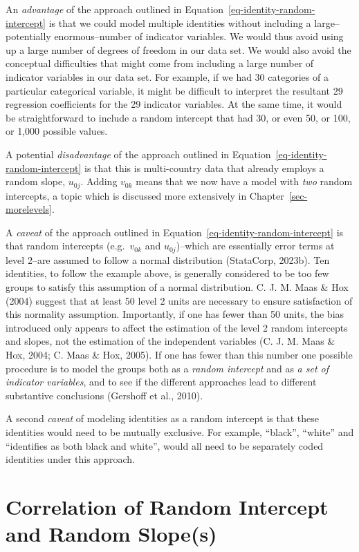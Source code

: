 \documentclass[
  letterpaper,
  DIV=11,
  numbers=noendperiod]{scrreprt}
\begin{document}
An \emph{advantage} of the approach outlined in
Equation~\ref{eq-identity-random-intercept} is that we could model
multiple identities without including a large--potentially
enormous--number of indicator variables. We would thus avoid using up a
large number of degrees of freedom in our data set. We would also avoid
the conceptual difficulties that might come from including a large
number of indicator variables in our data set. For example, if we had 30
categories of a particular categorical variable, it might be difficult
to interpret the resultant 29 regression coefficients for the 29
indicator variables. At the same time, it would be straightforward to
include a random intercept that had 30, or even 50, or 100, or 1,000
possible values.

A potential \emph{disadvantage} of the approach outlined in
Equation~\ref{eq-identity-random-intercept} is that this is
multi-country data that already employs a random slope, \(u_{0j}\).
Adding \(v_{0k}\) means that we now have a model with \emph{two} random
intercepts, a topic which is discussed more extensively in
Chapter~\ref{sec-morelevels}.

A \emph{caveat} of the approach outlined in
Equation~\ref{eq-identity-random-intercept} is that random intercepts
(e.g.~\(v_{0k}\) and \(u_{0j}\))--which are essentially error terms at
level 2--are assumed to follow a normal distribution (StataCorp, 2023b).
Ten identities, to follow the example above, is generally considered to
be too few groups to satisfy this assumption of a normal distribution.
C. J. M. Maas \& Hox (2004) suggest that at least 50 level 2 units are
necessary to ensure satisfaction of this normality assumption.
Importantly, if one has fewer than 50 units, the bias introduced only
appears to affect the estimation of the level 2 random intercepts and
slopes, not the estimation of the independent variables (C. J. M. Maas
\& Hox, 2004; C. Maas \& Hox, 2005). If one has fewer than this number
one possible procedure is to model the groups both as a \emph{random
intercept} and as \emph{a set of indicator variables}, and to see if the
different approaches lead to different substantive conclusions (Gershoff
et al., 2010).

A second \emph{caveat} of modeling identities as a random intercept is
that these identities would need to be mutually exclusive. For example,
``black'', ``white'' and ``identifies as both black and white'', would
all need to be separately coded identities under this approach.

\section{Correlation of Random Intercept and Random
Slope(s)}\label{correlation-of-random-intercept-and-random-slopes}
\end{document}
